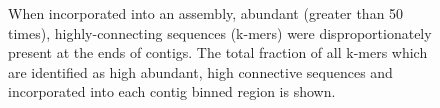 \documentclass[10pt]{article}
\begin{document}
\begin{figure}
\caption{When incorporated into an assembly, abundant (greater than 50 times), highly-connecting sequences (k-mers) were disproportionately present at the ends of contigs.  The total fraction of all k-mers which are identified as high abundant, high connective sequences and incorporated into each contig binned region is shown.}
\end{figure}
\end{document}
